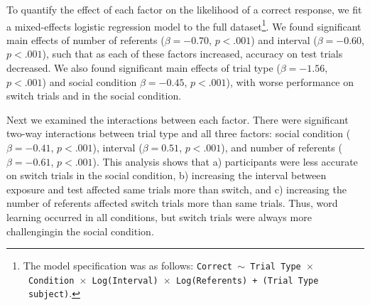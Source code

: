 \documentclass[10pt,letterpaper]{article}
\begin{document}
To quantify the effect of each factor on the likelihood of a correct response, we fit a mixed-effects logistic regression model to the full dataset\footnote{The model specification was as follows: \texttt{Correct $\sim$ Trial Type~$\times$~Condition~$\times$~Log(Interval)~$\times$~Log(Referents) + (Trial Type \textbar~subject)}.}. We found significant main effects of number of referents ($\beta= -0.70$, $p< .001$) and interval ($\beta= -0.60$, $p< .001$), such that as each of these factors increased, accuracy on test trials decreased. We also found significant main effects of trial type ($\beta= -1.56$, $p< .001$) and social condition $\beta= -0.45$, $p< .001$), with worse performance on switch trials and in the social condition. 

Next we examined the interactions between each factor. There were significant two-way interactions between trial type and all three factors: social condition ($\beta= -0.41$, $p< .001$), interval ($\beta= 0.51$, $p< .001$), and number of referents ($\beta=-0.61$, $p< .001$). This analysis shows that a) participants were less accurate on switch trials in the social condition, b) increasing the interval between exposure and test affected same trials more than switch, and c) increasing the number of referents affected switch trials more than same trials. Thus, word learning occurred in all conditions, but switch trials were always more challengingin the social condition.
\end{document}
